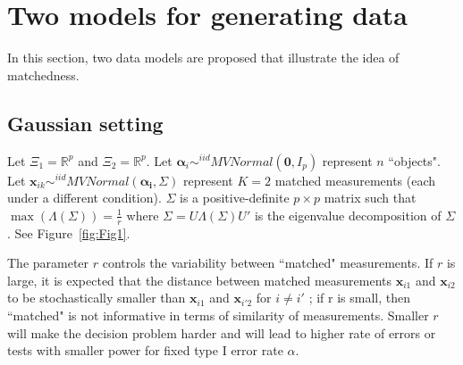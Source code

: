 \documentclass[11pt]{article} %
\begin{document}
\section{Two  models for generating data}
In this section, two data models are proposed that illustrate the idea of matchedness.
\subsection{Gaussian setting\label{subsec:GaussianSet}}
	Let    $\Xi_1 = \mathbb{R}^{p}$ and $\Xi_2 = \mathbb{R}^{p}$.
  Let $\bm{\alpha}_i \sim^{iid} MVNormal(\bm{0},I_p)$ represent $n$ ``objects".  Let $\bm{x}_{ik}  \sim^{iid} MVNormal(\bm{\alpha_i},\Sigma)$ represent $K=2$ matched measurements (each under a different condition).
  $\Sigma$ is a positive-definite $p\times p$ matrix such that  $\max(\Lambda(\Sigma))=\frac{1}{r} $ where $\Sigma=U\Lambda(\Sigma)U'$  is the eigenvalue decomposition of $\Sigma$. See Figure~\ref{fig:Fig1}.

The parameter $r$ controls the variability between ``matched" measurements. If $r$ is large, it is expected that the distance between matched measurements
$\bm{x}_{i1}$ and $\bm{x}_{i2}$ to be stochastically smaller than $\bm{x}_{i1}$ and $\bm{x}_{i'2}$ for $i \neq i'$ ; if r is small, then ``matched" is not informative in terms of similarity of measurements.
 Smaller $r$ will make the decision problem harder and will lead to higher rate of errors or tests with smaller power for fixed type I error rate $\alpha$.
  
\end{document}
